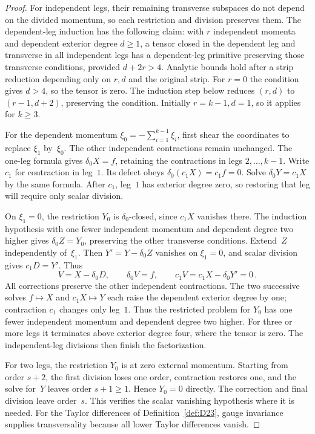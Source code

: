 \begin{proof}
For independent legs, their remaining transverse subspaces do not depend on the divided momentum, so each restriction and division preserves them. The dependent-leg induction has the following claim: with $r$ independent momenta and dependent exterior degree $d\ge1$, a tensor closed in the dependent leg and transverse in all independent legs has a dependent-leg primitive preserving those transverse conditions, provided $d+2r>4$. Analytic bounds hold after a strip reduction depending only on $r,d$ and the original strip. For $r=0$ the condition gives $d>4$, so the tensor is zero. The induction step below reduces $(r,d)$ to $(r-1,d+2)$, preserving the condition. Initially $r=k-1,d=1$, so it applies for $k\ge3$.

For the dependent momentum $\xi_0=-\sum_{i=1}^{k-1}\xi_i$, first shear the coordinates to replace $\xi_1$ by~$\xi_0$. The other independent contractions remain unchanged. The one-leg formula gives $\delta_0X=f$, retaining the contractions in legs $2,\ldots,k-1$. Write $c_1$ for contraction in leg~$1$. Its defect obeys $\delta_0(c_1X)=c_1f=0$. Solve $\delta_0Y=c_1X$ by the same formula. After $c_1$, leg~$1$ has exterior degree zero, so restoring that leg will require only scalar division.

On $\xi_1=0$, the restriction $Y_0$ is $\delta_0$-closed, since $c_1X$ vanishes there. The induction hypothesis with one fewer independent momentum and dependent degree two higher gives $\delta_0Z=Y_0$, preserving the other transverse conditions. Extend~$Z$ independently of~$\xi_1$. Then $Y'=Y-\delta_0Z$ vanishes on $\xi_1=0$, and scalar division gives $c_1D=Y'$. Thus
\begin{equation*}
V=X-\delta_0D,\qquad \delta_0V=f,\qquad c_1V=c_1X-\delta_0Y'=0\,.
\end{equation*}
All corrections preserve the other independent contractions. The two successive solves $f\mapsto X$ and $c_1X\mapsto Y$ each raise the dependent exterior degree by one; contraction $c_1$ changes only leg~$1$. Thus the restricted problem for $Y_0$ has one fewer independent momentum and dependent degree two higher. For three or more legs it terminates above exterior degree four, where the tensor is zero. The independent-leg divisions then finish the factorization.

For two legs, the restriction $Y_0$ is at zero external momentum. Starting from order $s+2$, the first division loses one order, contraction restores one, and the solve for~$Y$ leaves order $s+1\ge1$. Hence $Y_0=0$ directly. The correction and final division leave order~$s$. This verifies the scalar vanishing hypothesis where it is needed. For the Taylor differences of Definition~\ref{def:D23}, gauge invariance supplies transversality because all lower Taylor differences vanish.
\end{proof}


